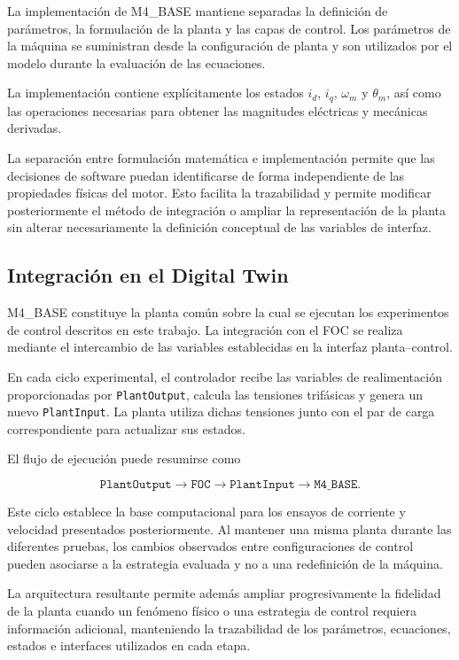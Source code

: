 La implementación de M4\_BASE mantiene separadas la definición de parámetros, la formulación de la planta y las capas de control. Los parámetros de la máquina se suministran desde la configuración de planta y son utilizados por el modelo durante la evaluación de las ecuaciones.

La implementación contiene explícitamente los estados $i_d$, $i_q$, $\omega_m$ y $\theta_m$, así como las operaciones necesarias para obtener las magnitudes eléctricas y mecánicas derivadas.

La separación entre formulación matemática e implementación permite que las decisiones de software puedan identificarse de forma independiente de las propiedades físicas del motor. Esto facilita la trazabilidad y permite modificar posteriormente el método de integración o ampliar la representación de la planta sin alterar necesariamente la definición conceptual de las variables de interfaz.

\subsection{Integración en el Digital Twin}

M4\_BASE constituye la planta común sobre la cual se ejecutan los experimentos de control descritos en este trabajo. La integración con el FOC se realiza mediante el intercambio de las variables establecidas en la interfaz planta--control.

En cada ciclo experimental, el controlador recibe las variables de realimentación proporcionadas por \texttt{PlantOutput}, calcula las tensiones trifásicas y genera un nuevo \texttt{PlantInput}. La planta utiliza dichas tensiones junto con el par de carga correspondiente para actualizar sus estados.

El flujo de ejecución puede resumirse como

\begin{equation}
\texttt{PlantOutput}
\rightarrow
\texttt{FOC}
\rightarrow
\texttt{PlantInput}
\rightarrow
\texttt{M4\_BASE}.
\end{equation}

Este ciclo establece la base computacional para los ensayos de corriente y velocidad presentados posteriormente. Al mantener una misma planta durante las diferentes pruebas, los cambios observados entre configuraciones de control pueden asociarse a la estrategia evaluada y no a una redefinición de la máquina.

La arquitectura resultante permite además ampliar progresivamente la fidelidad de la planta cuando un fenómeno físico o una estrategia de control requiera información adicional, manteniendo la trazabilidad de los parámetros, ecuaciones, estados e interfaces utilizados en cada etapa.
